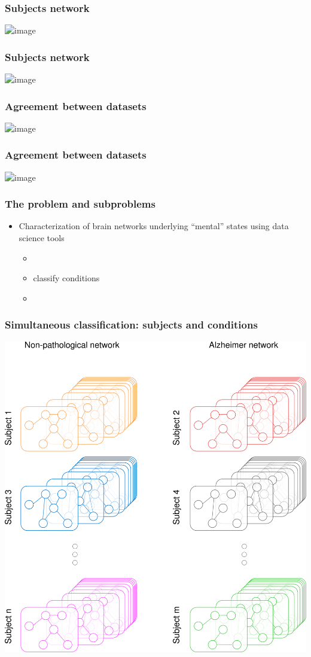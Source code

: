 \documentclass[final]{beamer}
\begin{document}
\begin{frame}
\frametitle{Subjects network}
\begin{center}
\includegraphics<1>[width=0.8\columnwidth]{subj_varying_links}
\end{center}
\end{frame}

\begin{frame}
\frametitle{Subjects network}
\begin{center}
\includegraphics<1>[width=0.8\columnwidth]{subj_net}
\end{center}
\end{frame}

\begin{frame}
\frametitle{Agreement between datasets}
\begin{center}
\includegraphics<1>[width=0.9\columnwidth]{avg_ranking_subsystems}
\end{center}
\end{frame}

\begin{frame}
\frametitle{Agreement between datasets}
\begin{center}
\includegraphics<1>[width=0.6\columnwidth]{subj_H0}
\end{center}
\end{frame}

\begin{frame}
\transdissolve
\frametitle{The problem and subproblems}
\begin{itemize}
	\item Characterization of brain networks underlying ``mental'' states 
using data science tools
	\begin{itemize}
		\item {}
		\item \alert<2>{classify conditions} 
		\item {}
	\end{itemize}
\end{itemize}
\end{frame}

\begin{frame}
\frametitle{Simultaneous classification: subjects and conditions}
\begin{center}
\includegraphics[width=0.6\columnwidth]{noise_mixture0}
\end{center}
\end{frame}
\end{document}
